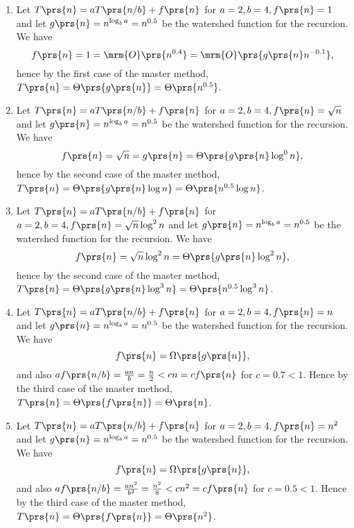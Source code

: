 \documentclass[oneside]{scrbook}
\theoremstyle{definition}
\begin{document}
\begin{exercise}
\begin{enumerate}[label = \alph*.]
\item %
Let $T\prs{n} = aT\prs{n/b} + f\prs{n}$ for $a = 2, b = 4, f\prs{n} = 1$ and let $g\prs{n} = n^{\log_b a} = n^{0.5}$ be the watershed function for the recursion.
We have \[f\prs{n} = 1 = \mrm{O}\prs{n^{0.4}} = \mrm{O}\prs{g\prs{n} n^{-0.1}} \text{,} \]
hence by the first case of the master method, $T\prs{n} = \Theta\prs{g\prs{n}} = \Theta\prs{n^{0.5}}$.

\item %
Let $T\prs{n} = aT\prs{n/b} + f\prs{n}$ for $a = 2, b = 4, f\prs{n} = \sqrt{n}$ and let $g\prs{n} = n^{\log_b a} = n^{0.5}$ be the watershed function for the recursion.
We have \[f\prs{n} = \sqrt{n} = g\prs{n} = \Theta\prs{g\prs{n} \log^0 n} \text{,} \]
hence by the second case of the master method, $T\prs{n} = \Theta\prs{g\prs{n} \log n} = \Theta\prs{n^{0.5} \log n}$.

\item %
Let $T\prs{n} = aT\prs{n/b} + f\prs{n}$ for $a = 2, b = 4, f\prs{n} = \sqrt{n} \log^2 n$ and let $g\prs{n} = n^{\log_b a} = n^{0.5}$ be the watershed function for the recursion.
We have \[f\prs{n} = \sqrt{n} \log^2 n = \Theta\prs{g\prs{n} \log^2 n} \text{,} \]
hence by the second case of the master method, $T\prs{n} = \Theta\prs{g\prs{n} \log^3 n} = \Theta\prs{n^{0.5} \log^3 n}$.

\item %
Let $T\prs{n} = aT\prs{n/b} + f\prs{n}$ for $a = 2, b = 4, f\prs{n} = n$ and let $g\prs{n} = n^{\log_b a} = n^{0.5}$ be the watershed function for the recursion.
We have \[f\prs{n} = \Omega\prs{g\prs{n}} \text{,} \]
and also $a f\prs{n/b} = \frac{an}{b} = \frac{n}{2} < c n = cf\prs{n}$ for $c = 0.7 < 1$.
Hence by the third case of the master method, $T\prs{n} = \Theta\prs{f\prs{n}} = \Theta\prs{n}$.

\item %
Let $T\prs{n} = aT\prs{n/b} + f\prs{n}$ for $a = 2, b = 4, f\prs{n} = n^2$ and let $g\prs{n} = n^{\log_b a} = n^{0.5}$ be the watershed function for the recursion.
We have \[f\prs{n} = \Omega\prs{g\prs{n}} \text{,} \]
and also $a f\prs{n/b} = \frac{an^2}{b^2} = \frac{n^2}{8} < c n^2 = cf\prs{n}$ for $c = 0.5 < 1$.
Hence by the third case of the master method, $T\prs{n} = \Theta\prs{f\prs{n}} = \Theta\prs{n^2}$.
\end{enumerate}
\end{exercise}
\end{document}
